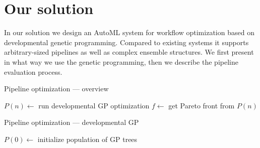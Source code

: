 \chapter{Our solution} \label{our:solution}

In our solution we design an AutoML system for workflow optimization based on
developmental genetic programming. Compared to existing systems it supports 
arbitrary-sized pipelines as well as complex ensemble structures. We first
present in what way we use the genetic programming, then we describe the
pipeline evaluation process.


\begin{algorithm}
\DontPrintSemicolon 
\caption{Pipeline optimization --- overview\label{alg:genens}}
  \;
   \;
  $P(n) \longleftarrow$ run developmental GP optimization \;
  $f \longleftarrow$ get Pareto front from $P(n)$
  \;\;
  
\end{algorithm}


\begin{algorithm}
\DontPrintSemicolon 
\caption{Pipeline optimization --- developmental GP}
  \SetNoFillComment
  \;
 
  \;
  $P(0) \longleftarrow$ initialize population of GP trees
 
  \;
\end{algorithm}



